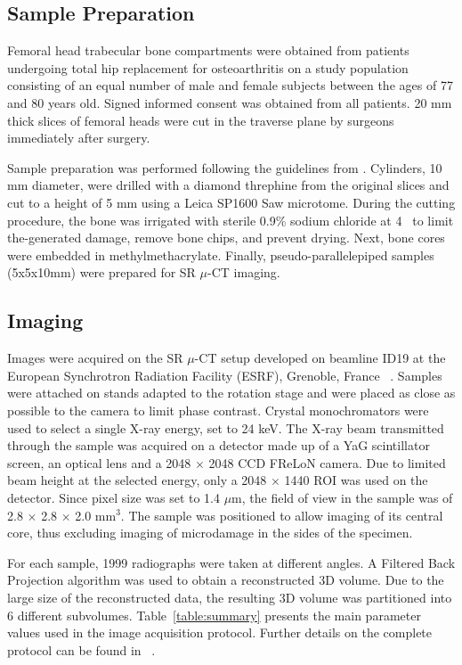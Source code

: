 \documentclass{InsightArticle}
\begin{document}
\subsection{Sample Preparation}
Femoral head trabecular bone compartments were obtained from patients undergoing
total hip replacement for osteoarthritis on a study population consisting of
an equal number of male and female subjects between the ages of 77 and 80 years
old. Signed informed consent was obtained from all patients. 20 mm thick slices
of femoral heads were cut in the traverse plane by surgeons immediately after
surgery.

Sample preparation was performed following the guidelines from \cite{Davies2006}.
Cylinders, 10 mm diameter, were drilled with a diamond threphine from the original
slices and cut to a height of 5 mm using a Leica SP1600 Saw microtome. During the
cutting procedure, the bone was irrigated with sterile 0.9\% sodium chloride at
4\textcelsius\verb+ + %
to limit the-generated damage, remove bone chips, and prevent drying.
Next, bone cores were embedded in methylmethacrylate. Finally, pseudo-parallelepiped
samples (5x5x10mm) were prepared for SR $\mu$-CT imaging.

\subsection{Imaging}
Images were acquired on the SR $\mu$-CT setup developed on beamline ID19 at
the European Synchrotron Radiation Facility (ESRF), Grenoble, France~
\cite{Weitkamp2010}.
Samples were attached on stands adapted to the rotation stage and were placed as
close as possible to the camera to limit phase contrast. Crystal monochromators
were used to select a single X-ray energy, set to 24 keV. The X-ray beam
transmitted through the sample was acquired on a detector made up of a YaG
scintillator screen, an optical lens and a 2048 $\times$ 2048 CCD FReLoN camera.
Due to limited beam height at the selected energy, only a 2048 $\times$ 1440 ROI
was used on the detector. Since pixel size was set to 1.4 $\mu$m, the field of
view in the sample was of 2.8 $\times$ 2.8 $\times$ 2.0 mm$^3$. The sample was
positioned to allow imaging of its central core, thus excluding imaging of
microdamage in the sides of the specimen.

For each sample, 1999 radiographs were taken at different angles. A Filtered
Back Projection algorithm was used to obtain a reconstructed 3D volume. Due to the
large size of the reconstructed data, the resulting 3D volume was partitioned
into 6 different subvolumes. Table~\ref{table:summary} presents the main
parameter values used in the image acquisition protocol. Further details on the
complete protocol can be found in ~\cite{Larrue2011}.
\end{document}
